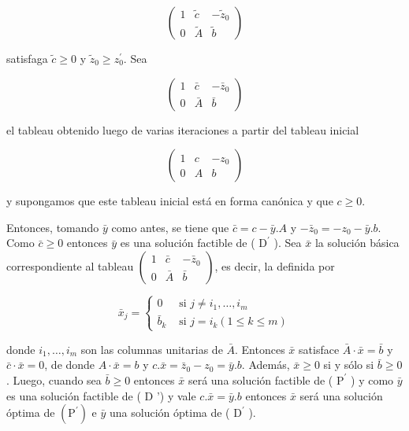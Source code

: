 \documentclass[10pt]{article}
\begin{document}
$$
\left(\begin{array}{cc|c}
1 & \tilde{c} & -\tilde{z}_{0} \\
0 & \tilde{A} & \tilde{b}
\end{array}\right)
$$

satisfaga $\tilde{c} \geq 0$ y $\tilde{z}_{0} \geq z_{0}^{\prime}$. Sea

$$
\left(\begin{array}{cc|c}
1 & \bar{c} & -\bar{z}_{0} \\
0 & \bar{A} & \bar{b}
\end{array}\right)
$$

el tableau obtenido luego de varias iteraciones a partir del tableau inicial

$$
\left(\begin{array}{cc|c}
1 & c & -z_{0} \\
0 & A & b
\end{array}\right)
$$

y supongamos que este tableau inicial está en forma canónica y que $c \geq 0$.

Entonces, tomando $\bar{y}$ como antes, se tiene que $\bar{c}=c-\bar{y} . A$ y $-\bar{z}_{0}=-z_{0}-\bar{y} . b$. Como $\bar{c} \geq 0$ entonces $\bar{y}$ es una solución factible de ( $\mathrm{D}^{\prime}$ ). Sea $\bar{x}$ la solución básica correspondiente al tableau $\left(\begin{array}{cc|c}1 & \bar{c} & -\bar{z}_{0} \\ 0 & \bar{A} & \bar{b}\end{array}\right)$, es decir, la definida por

$$
\bar{x}_{j}= \begin{cases}0 & \text { si } j \neq i_{1}, \ldots, i_{m} \\ \bar{b}_{k} & \text { si } j=i_{k}(1 \leq k \leq m)\end{cases}
$$

donde $i_{1}, \ldots, i_{m}$ son las columnas unitarias de $\bar{A}$. Entonces $\bar{x}$ satisface $\bar{A} \cdot \bar{x}=\bar{b}$ y $\bar{c} \cdot \bar{x}=0$, de donde $A \cdot \bar{x}=b$ y $c . \bar{x}=\bar{z}_{0}-z_{0}=\bar{y} . b$. Además, $\bar{x} \geq 0$ si y sólo si $\bar{b} \geq 0$. Luego, cuando sea $\bar{b} \geq 0$ entonces $\bar{x}$ será una solución factible de ( $\mathrm{P}^{\prime}$ ) y como $\bar{y}$ es una solución factible de ( D ') y vale $c . \bar{x}=\bar{y} . b$ entonces $\bar{x}$ será una solución óptima de $\left(\mathrm{P}^{\prime}\right)$ e $\bar{y}$ una solución óptima de ( $\mathrm{D}^{\prime}$ ).
\end{document}
